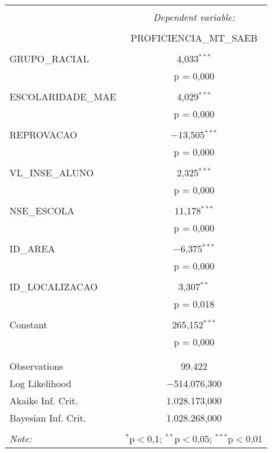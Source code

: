 \begin{table}[!htbp] \centering 
  \caption{} 
  \label{} 
\begin{tabular}{@{\extracolsep{5pt}}lc} 
\\[-1.8ex]\hline 
\hline \\[-1.8ex] 
 & \multicolumn{1}{c}{\textit{Dependent variable:}} \\ 
\cline{2-2} 
\\[-1.8ex] & PROFICIENCIA\_MT\_SAEB \\ 
\hline \\[-1.8ex] 
 GRUPO\_RACIAL & 4,033$^{***}$ \\ 
  & p = 0,000 \\ 
  & \\ 
 ESCOLARIDADE\_MAE & 4,029$^{***}$ \\ 
  & p = 0,000 \\ 
  & \\ 
 REPROVACAO & $-$13,505$^{***}$ \\ 
  & p = 0,000 \\ 
  & \\ 
 VL\_INSE\_ALUNO & 2,325$^{***}$ \\ 
  & p = 0,000 \\ 
  & \\ 
 NSE\_ESCOLA & 11,178$^{***}$ \\ 
  & p = 0,000 \\ 
  & \\ 
 ID\_AREA & $-$6,375$^{***}$ \\ 
  & p = 0,000 \\ 
  & \\ 
 ID\_LOCALIZACAO & 3,307$^{**}$ \\ 
  & p = 0,018 \\ 
  & \\ 
 Constant & 265,152$^{***}$ \\ 
  & p = 0,000 \\ 
  & \\ 
\hline \\[-1.8ex] 
Observations & 99.422 \\ 
Log Likelihood & $-$514.076,300 \\ 
Akaike Inf. Crit. & 1.028.173,000 \\ 
Bayesian Inf. Crit. & 1.028.268,000 \\ 
\hline 
\hline \\[-1.8ex] 
\textit{Note:}  & \multicolumn{1}{r}{$^{*}$p$<$0,1; $^{**}$p$<$0,05; $^{***}$p$<$0,01} \\ 
\end{tabular} 
\end{table} 

